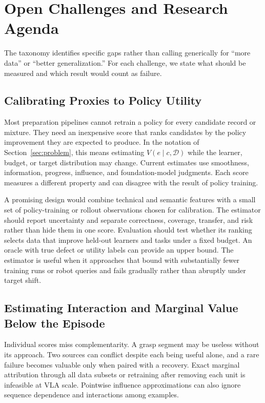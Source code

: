 \section{Open Challenges and Research Agenda}
\label{sec:agenda}

The taxonomy identifies specific gaps rather than calling generically for ``more data'' or ``better generalization.'' For each challenge, we state what should be measured and which result would count as failure.

\subsection{Calibrating Proxies to Policy Utility}

Most preparation pipelines cannot retrain a policy for every candidate record or mixture.
They need an inexpensive score that ranks candidates by the policy improvement they are expected to produce.
In the notation of Section~\ref{sec:problem}, this means estimating $V(e\mid c,\mathcal{D})$ while the learner, budget, or target distribution may change.
Current estimates use smoothness, information, progress, influence, and foundation-model judgments.
Each score measures a different property and can disagree with the result of policy training.

A promising design would combine technical and semantic features with a small set of policy-training or rollout observations chosen for calibration.
The estimator should report uncertainty and separate correctness, coverage, transfer, and risk rather than hide them in one score.
Evaluation should test whether its ranking selects data that improve held-out learners and tasks under a fixed budget.
An oracle with true defect or utility labels can provide an upper bound.
The estimator is useful when it approaches that bound with substantially fewer training runs or robot queries and fails gradually rather than abruptly under target shift.

\subsection{Estimating Interaction and Marginal Value Below the Episode}

Individual scores miss complementarity.
A grasp segment may be useless without its approach.
Two sources can conflict despite each being useful alone, and a rare failure becomes valuable only when paired with a recovery.
Exact marginal attribution through all data subsets or retraining after removing each unit is infeasible at VLA scale.
Pointwise influence approximations can also ignore sequence dependence and interactions among examples.

